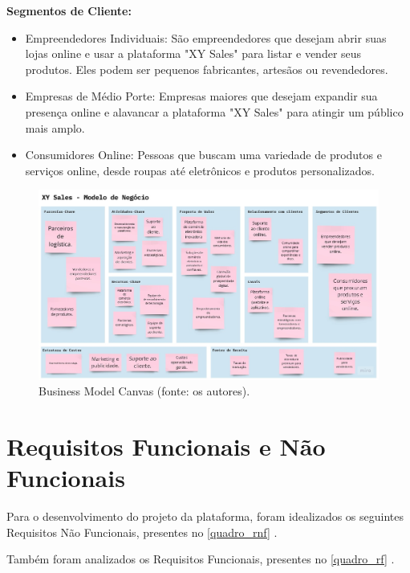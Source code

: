 \documentclass[
	12pt,				%
	openright,			%
	twoside,			%
	a4paper,			%
	english,			%
	brazil				%
	]{abntex2}
\begin{document}
\textbf{Segmentos de Cliente:}
\begin{itemize}
    \item Empreendedores Individuais: São empreendedores que desejam abrir suas lojas online e usar a plataforma "XY Sales" para listar e vender seus produtos. Eles podem ser pequenos fabricantes, artesãos ou revendedores.
    \item Empresas de Médio Porte: Empresas maiores que desejam expandir sua presença online e alavancar a plataforma "XY Sales" para atingir um público mais amplo.
    \item Consumidores Online: Pessoas que buscam uma variedade de produtos e serviços online, desde roupas até eletrônicos e produtos personalizados.
\end{itemize}

\begin{figure}[htb]
	\centering
	\includegraphics[width=1\textwidth]{img/business-model-canvas}
	\caption{Business Model Canvas (fonte: os autores).}
	\label{fig:business-model-canvas}
\end{figure}

\section{Requisitos Funcionais e Não Funcionais}

Para o desenvolvimento do projeto da plataforma, foram idealizados os seguintes Requisitos Não Funcionais, presentes no \autoref{quadro_rnf} . 

Também foram analizados os Requisitos Funcionais, presentes no \autoref{quadro_rf} .
\end{document}
